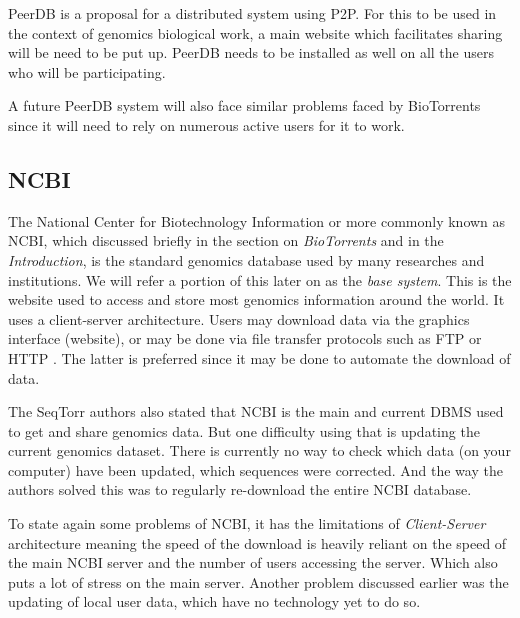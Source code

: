 \documentclass[acmsmall]{acmart}
\begin{document}
\begin{multicols}{2}
PeerDB is a proposal for a distributed system using P2P. For this to be used in the context of genomics biological work, a main website which facilitates sharing will be need to be put up. PeerDB needs to be installed as well on all the users who will be participating.

A future PeerDB system will also face similar problems faced by BioTorrents since it will need to rely on numerous active users for it to work.

\subsection{NCBI} \label{NCBI}
The National Center for Biotechnology Information or more commonly known as NCBI, which discussed briefly in the section on \textit{BioTorrents} and in the \textit{Introduction}, is the standard genomics database used by many researches and institutions. We will refer a portion of this later on as the \textit{base system}. This is the website used to access and store most genomics information around the world\cite{campbell}. It uses a client-server architecture. Users may download data via the graphics interface (website), or may be done via file transfer protocols such as FTP or HTTP \cite{biotorrents}. The latter is preferred since it may be done to automate the download of data.

The SeqTorr authors\cite{seqtorr} also stated that NCBI is the main and current DBMS used to get and share genomics data. But one difficulty using that is updating the current genomics dataset. There is currently no way to check which data (on your computer) have been updated, which sequences were corrected. And the way the authors solved this was to regularly re-download the entire NCBI database.

To state again some problems of NCBI, it has the limitations of \textit{Client-Server} architecture meaning the speed of the download is heavily reliant on the speed of the main NCBI server and the number of users accessing the server. Which also puts a lot of stress on the main server. Another problem discussed earlier was the updating of local user data, which have no technology yet to do so.




\end{multicols}
\end{document}

